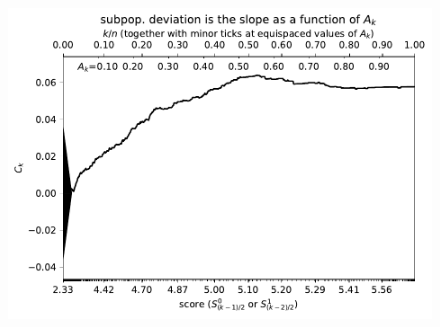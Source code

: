 \documentclass{article}
\newlength{\vertsep}
\newlength{\imsize}
\begin{document}
\begin{figure}
\begin{centering}

\parbox{\imsize}{\includegraphics[width=\imsize]
{../codes/weighted/County_of_San_Francisco_vs_Contra_Costa-LNGI/cumulative.pdf}}

\vspace{\vertsep}


\end{centering}
\end{figure}
\end{document}
